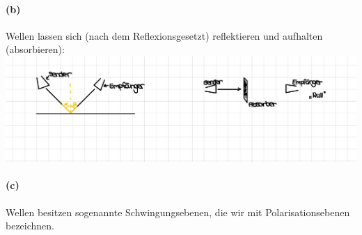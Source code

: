 \documentclass[12pt,a4paper]{report}
\begin{document}
	\paragraph{(b)} Wellen lassen sich (nach dem Reflexionsgesetzt) reflektieren und aufhalten (absorbieren):\\[0.5cm]
	\includegraphics[width=\textwidth]{JPEG-Bild-43D0-B0E1-0A-0.JPEG}
	\paragraph{(c)} Wellen besitzen sogenannte \dq Schwingungsebenen\dq, die wir mit Polarisationsebenen bezeichnen.
\end{document}
